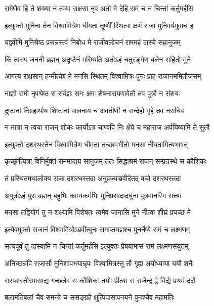 \twolineshloka
{रामेणैव हि ते शक्या न त्वया राक्षसा नृप}
{अतो मे देहि रामं च न चिन्तां कर्तुमर्हसि} %

\twolineshloka
{इत्युक्तो मुनिना तेन विश्वामित्रेण धीमता}
{तूष्णीं स्थित्वा क्षणं राजा मुनिवर्यमुवाच ह} %

\twolineshloka
{यद्ववीमि मुनिश्रेष्ठ प्रसन्नस्त्वं निबोध मे}
{राजीवलोचनं राममहं दास्ये सहानुजम्} %

\twolineshloka
{किं त्वस्य जननी ब्रह्मन् अदृष्टैनं मरिष्यति}
{अतोऽहं चतुरङ्गेण बलेन सहितो मुने} %

\twolineshloka
{आगत्य राक्षसान् हन्मीत्येबं मे मनसि स्थितम्}
{विश्वामित्रः पुनः प्राह राजानममितौजसम्} %

\twolineshloka
{नाज्ञो रामो नृपश्रेष्ठ स सर्वज्ञः समः क्षमः}
{शेषनारायणावेतौ तव पुत्रौ न संशयः} %

\twolineshloka
{दुष्टानां निग्रहार्थाय शिष्टानां पालनाय च}
{अवतीर्णो न सन्देहो गृहे तव नराधिप} %

\twolineshloka
{न मात्रा न त्वया राजन् शोकः कार्योऽत्र चाण्वपि}
{निः क्षेपे च महाराज अर्पयिष्यामि ते सुतौ} %

\twolineshloka
{इत्युक्तो दशरथस्तेन विश्वामित्रेण धीमता}
{तच्छापभीतो मनसा नीयतामित्यभाषत्} %

\twolineshloka
{कृच्छ्रात्पित्रा विनिर्मुक्तं राममादाय सानुजम्}
{ततः सिद्धाश्रमं राजन् सम्प्रतस्थे स कौशिकः} %

\twolineshloka
{तं प्रस्थितमथालोक्य राजा दशरथस्तदा}
{अनुव्रज्याब्रवीदेतद् वचो दशरथस्तदा} %

\twolineshloka
{अपुत्रोऽहं पुरा ब्रह्मन् बहुभिः काम्यकर्मभिः}
{मुनिप्रसादादधुना पुत्रवानस्मि सत्तम} %

\twolineshloka
{मनसा तद्वियोगं तु न शक्ष्यामि विशेषतः}
{त्वमेव जानासि मुने नीत्वा शीघ्रं प्रयच्छ मे} %

\twolineshloka
{इत्येवमुक्तो राजानं विश्वामित्रोऽब्रवीत्पुनः}
{समाप्तयज्ञश्च पुनर्नेष्ये रामं च लक्ष्मणम्} %

\twolineshloka
{सत्यपूर्वं तु दास्यामि न चिन्तां कर्तुमर्हसि}
{इत्युक्तः प्रेषयामास रामं लक्ष्मणसंयुतम्} %

\twolineshloka
{अनिच्छन्नपि राजासौ मुनिशापभयान्नृपः}
{विश्वामित्रस्तु तौ गृह्य अयोध्याया ययौ शनैः} %

\twolineshloka
{सरय्वास्तीरमासाद्य गच्छन्नेव स कौशिकः}
{तयोः प्रीत्या स राजेन्द्र द्वे विद्ये प्रथमं ददौ} %

\twolineshloka
{बलामतिबलां चैव समन्त्रे च ससङ्ग्रहे}
{क्षुत्पिपासापनयने पुनश्चैव महामतिः} %

